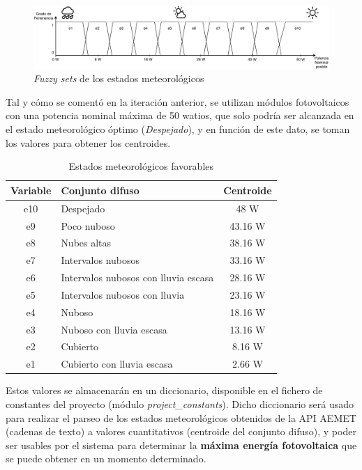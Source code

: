 \begin{figure}[h]
	\centering
	\includegraphics[width=17cm]{figs/Fuzzy_diagram.pdf}
	\caption{\textit{Fuzzy sets} de los estados meteorológicos}
        \label{fig:fuzzySets}
\end{figure}

Tal y cómo se comentó en la iteración anterior, se utilizan módulos fotovoltaicos con una potencia nominal máxima de 50 watios, que solo podría ser alcanzada en el estado meteorológico óptimo (\textit{Despejado}), y en función de este dato, se toman los valores para obtener los centroides.
\begin{table}[hp]
        \centering
        \begin{tabular}{|c|l|c|}
                \hline
                \textbf{Variable} & \textbf{Conjunto difuso} & \textbf{Centroide} \\ \hline
                e10 & Despejado & 48 W \\ \hline
                e9 & Poco nuboso & 43.16 W \\ \hline
                e8 & Nubes altas & 38.16 W \\ \hline
                e7 & Intervalos nubosos & 33.16 W \\ \hline
                e6 & Intervalos nubosos con lluvia escasa & 28.16 W \\ \hline
                e5 & Intervalos nubosos con lluvia & 23.16 W \\ \hline
                e4 & Nuboso & 18.16 W \\ \hline
                e3 & Nuboso con lluvia escasa & 13.16 W \\ \hline
                e2 & Cubierto & 8.16 W \\ \hline
                e1 & Cubierto con lluvia escasa & 2.66 W\\ \hline
        \end{tabular}
        \caption{Estados meteorológicos favorables}
        \label{tab:estadosFavorables}
\end{table}

Estos valores se almacenarán en un diccionario, disponible en el fichero de constantes del proyecto (módulo \textit{project\_constants}). Dicho diccionario será usado para realizar el parseo de los estados meteorológicos obtenidos de la API AEMET (cadenas de texto) a valores cuantitativos (centroide del conjunto difuso), y poder ser usables por el sistema para determinar la \textbf{máxima energía fotovoltaica} que se puede obtener en un momento determinado.
